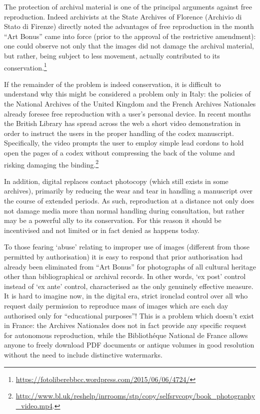 \documentclass[amsthm,ebook]{saparticle}
\begin{document}
The protection of archival material is one of the principal arguments against free reproduction. Indeed archivists at
the State Archives of Florence (Archivio di Stato di Firenze) directly noted the advantages of free reproduction in the
month ``Art Bonus'' came into force (prior to the approval of the restrictive amendment): one could observe not only that
the images did not damage the archival material, but rather, being subject to less movement, actually contributed to
its conservation.\footnote{\url{https://fotoliberebbcc.wordpress.com/2015/06/06/4724/}}

If the remainder of the problem is indeed conservation, it is difficult to understand why this might be considered a
problem only in Italy: the policies of the National Archives of the United Kingdom and the French Archives Nationales
already foresee free reproduction with a user’s personal device. In recent months the British Library has spread across
the web a short video demonstration in order to instruct the users in the proper handling of the codex manuscript.
Specifically, the video prompts the user to employ simple lead cordons to hold open the pages of a codex without
compressing the back of the volume and risking damaging the
binding.\footnote{\url{http://www.bl.uk/reshelp/inrrooms/stp/copy/selfsrvcopy/book\_photography\_video.mp4}.}

In addition, digital replaces contact photocopy (which still exists in some archives), primarily by reducing the wear
and tear in handling a manuscript over the course of extended periods. As such, reproduction at a distance not only
does not damage media more than normal handling during consultation, but rather may be a powerful ally to its
conservation. For this reason it should be incentivised and not limited or in fact denied as happens today. 

To those fearing `abuse' relating to improper use of images (different from those permitted by authorisation) it is easy
to respond that prior authorisation had already been eliminated from ``Art Bonus'' for photographs of all cultural
heritage other than bibliographical or archival records. In other words, `ex post' control instead of `ex ante'
control, characterised as the only genuinely effective measure. It is hard to imagine now, in the digital era, strict
ironclad control over all who request daily permission to reproduce mass of images which are each day authorised only
for ``educational purposes''! This is a problem which doesn’t exist in France: the Archives Nationales does not in fact
provide any specific request for autonomous reproduction, while the Bibliothéque National de France allows anyone to
freely download PDF documents or antique volumes in good resolution without the need to include distinctive watermarks.
\end{document}

